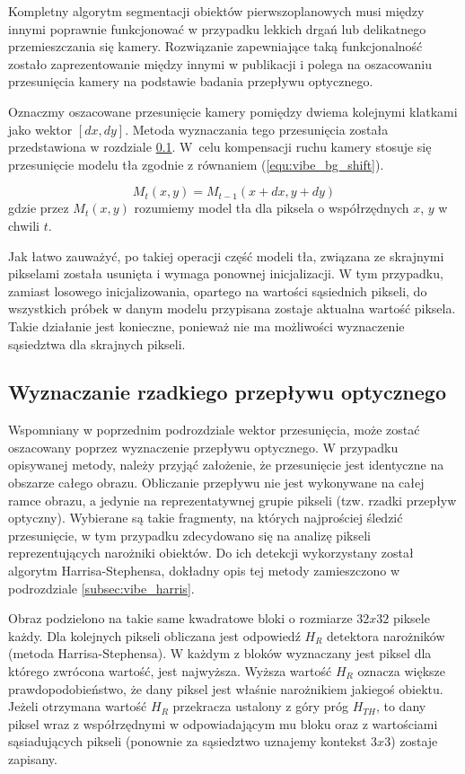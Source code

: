 Kompletny algorytm segmentacji obiektów pierwszoplanowych musi między innymi poprawnie funkcjonować w przypadku lekkich drgań lub delikatnego przemieszczania się kamery. Rozwiązanie zapewniające taką funkcjonalność zostało zaprezentowanie między innymi w publikacji \cite{kryjak_14_vibe} i polega na oszacowaniu przesunięcia kamery na podstawie badania przepływu optycznego. %

Oznaczmy oszacowane przesunięcie kamery pomiędzy dwiema kolejnymi klatkami jako wektor $[dx,dy]$. 
Metoda wyznaczania tego przesunięcia została przedstawiona w rozdziale \ref{subsec:vibe_of}. 
W~celu kompensacji ruchu kamery stosuje się przesunięcie modelu tła zgodnie z równaniem (\ref{equ:vibe_bg_shift}).

	\begin{equation}
	M_t(x,y) = M_{t-1}(x+dx,y+dy)
	\label{equ:vibe_bg_shift}
	\end{equation}
gdzie przez $M_t(x,y)$ rozumiemy model tła dla piksela o współrzędnych $x$, $y$ w chwili $t$.


Jak łatwo zauważyć, po takiej operacji część modeli tła, związana ze skrajnymi pikselami została usunięta i wymaga ponownej inicjalizacji. W tym przypadku, zamiast losowego inicjalizowania, opartego na wartości sąsiednich pikseli, do wszystkich próbek w danym modelu przypisana zostaje aktualna wartość piksela. Takie działanie jest konieczne, ponieważ nie ma możliwości wyznaczenie sąsiedztwa dla skrajnych pikseli.


\subsection{Wyznaczanie rzadkiego przepływu optycznego}
\label{subsec:vibe_of}

Wspomniany w poprzednim podrozdziale wektor przesunięcia, może zostać oszacowany poprzez wyznaczenie przepływu optycznego. 
W przypadku opisywanej metody, należy przyjąć założenie, że przesunięcie jest identyczne na obszarze całego obrazu. 
Obliczanie przepływu nie jest wykonywane na całej ramce obrazu, a jedynie na reprezentatywnej grupie pikseli (tzw. rzadki przepływ optyczny). 
Wybierane są takie fragmenty, na których najprościej śledzić przesunięcie, w tym przypadku zdecydowano się na analizę pikseli reprezentujących narożniki obiektów. 
Do ich detekcji wykorzystany został algorytm Harrisa-Stephensa, dokładny opis tej metody zamieszczono w podrozdziale \ref{subsec:vibe_harris}.

Obraz podzielono na takie same kwadratowe bloki o rozmiarze $32x32$ piksele każdy. Dla kolejnych pikseli obliczana jest odpowiedź $H_R$ detektora narożników (metoda Harrisa-Stephensa). 
W każdym z bloków wyznaczany jest piksel dla którego zwrócona wartość, jest najwyższa. Wyższa wartość $H_R$ oznacza większe prawdopodobieństwo, że dany piksel jest właśnie narożnikiem jakiegoś obiektu. Jeżeli otrzymana wartość $H_R$ przekracza ustalony z góry próg $H_{TH}$, to dany piksel wraz z współrzędnymi w odpowiadającym mu bloku oraz z wartościami sąsiadujących pikseli (ponownie za sąsiedztwo uznajemy kontekst $3x3$) zostaje zapisany.

